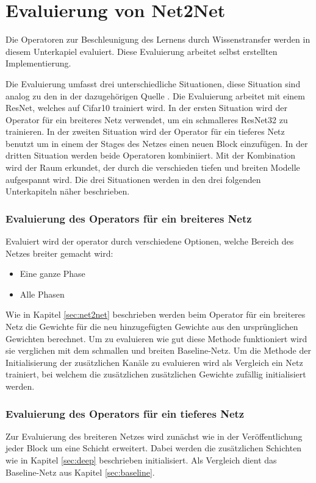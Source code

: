 \chapter{Evaluierung von Net2Net}\label{sec:net2netexperimente}
Die Operatoren zur Beschleunigung des Lernens durch Wissenstransfer werden in diesem Unterkapiel evaluiert. Diese Evaluierung arbeitet selbst erstellten Implementierung.

Die Evaluierung umfasst drei unterschiedliche Situationen, diese Situation sind analog zu den in der dazugehörigen Quelle \cite{net2net}. Die Evaluierung arbeitet mit einem ResNet, welches auf Cifar10 trainiert wird. In der ersten Situation wird der Operator für ein breiteres Netz verwendet, um ein schmalleres ResNet32 zu trainieren. In der zweiten Situation wird der Operator für ein tieferes Netz benutzt um in einem der Stages des Netzes einen neuen Block einzufügen. In der dritten Situation werden beide Operatoren kombiniiert. Mit der Kombination wird der Raum erkundet, der durch die verschieden tiefen und breiten Modelle aufgespannt wird.
Die drei Situationen werden in den drei folgenden Unterkapiteln näher beschrieben.




\subsection{Evaluierung des Operators für ein breiteres Netz}
Evaluiert wird der operator durch verschiedene Optionen, welche Bereich des Netzes breiter gemacht wird:
\begin{itemize}
 \item Eine ganze Phase
 \item Alle Phasen
\end{itemize}
Wie in Kapitel \ref{sec:net2net} beschrieben werden beim Operator für ein breiteres Netz die Gewichte für die neu hinzugefügten Gewichte aus den ursprünglichen Gewichten berechnet. Um zu evaluieren wie gut diese Methode funktioniert wird sie verglichen mit dem schmallen und breiten Baseline-Netz. Um die Methode der Initialisierung der zusätzlichen Kanäle zu evaluieren wird als Vergleich ein Netz trainiert, bei welchem die zusätzlichen zusätzlichen Gewichte zufällig initialisiert werden.
\subsection{Evaluierung des Operators für ein tieferes Netz}
Zur Evaluierung des breiteren Netzes wird zunächst wie in der Veröffentlichung jeder Block um eine Schicht erweitert. Dabei werden die zusätzlichen Schichten wie in Kapitel \ref{sec:deep} beschrieben initialisiert. Als Vergleich dient das Baseline-Netz aus Kapitel \ref{sec:baseline}.



